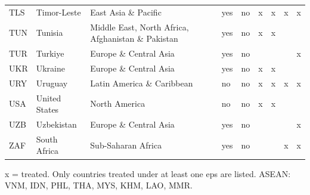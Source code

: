 \begin{table}[htbp]
\begin{tabular}{llllcccc}
TLS & Timor-Leste & East Asia \& Pacific & yes & no & x & x & x & x \\
TUN & Tunisia & Middle East, North Africa, Afghanistan \& Pakistan & yes & no & x & x &  &  \\
TUR & Turkiye & Europe \& Central Asia & yes & no &  &  &  & x \\
UKR & Ukraine & Europe \& Central Asia & yes & no & x & x &  &  \\
URY & Uruguay & Latin America \& Caribbean & no & no & x & x & x & x \\
USA & United States & North America & no & no & x & x &  &  \\
UZB & Uzbekistan & Europe \& Central Asia & yes & no &  &  &  & x \\
ZAF & South Africa & Sub-Saharan Africa & yes & no &  &  & x & x \\
\bottomrule
\end{tabular}
\par\smallskip\footnotesize x = treated. Only countries treated under at least one eps are listed. ASEAN: VNM, IDN, PHL, THA, MYS, KHM, LAO, MMR.
\end{table}
